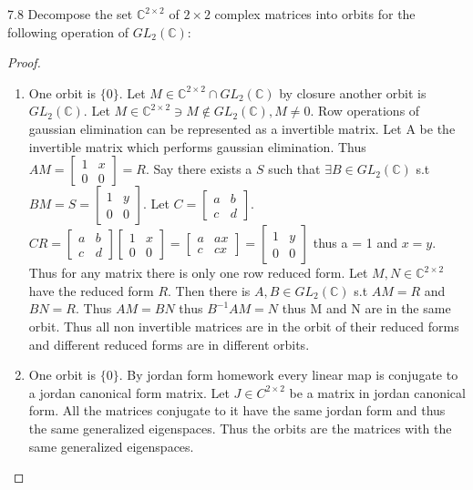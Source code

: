 \documentclass{article}
\newcommand{\C}{\mathbb{C}}
\begin{document}
\bigskip

\begin{PROB}{7.8}\label{Problem 7.8.}
    Decompose the set $\C^{2 \times 2}$ of $2 \times 2$ complex matrices into orbits for the following operation of $GL_2(\C)$:
\end{PROB}
\begin{proof}
    \begin{enumerate}{}
        \item One orbit is $\{0\}$. Let $M \in \C^{2 \times 2} \cap GL_2(\C)$ by closure another orbit is $GL_2(\C)$. Let $M \in \C^{2 \times 2} \ni M \not \in GL_2(\C), M \neq 0$. Row operations of gaussian elimination can be represented as a invertible matrix. Let A be the invertible matrix which performs gaussian elimination. Thus $AM = \begin{bmatrix}
            1 & x \\ 0 & 0
        \end{bmatrix} = R$. Say there exists a $S$ such that $\exists B \in GL_2(\C)$ s.t $BM = S = \begin{bmatrix}
            1 & y \\ 0 & 0
        \end{bmatrix}$. Let $C = \begin{bmatrix}
            a & b \\ c & d
        \end{bmatrix}$. $CR = \begin{bmatrix}
            a & b \\ c & d
        \end{bmatrix}\begin{bmatrix}
            1 & x \\ 0 & 0
        \end{bmatrix} = \begin{bmatrix}
            a & ax \\ c & cx
        \end{bmatrix} = \begin{bmatrix}
            1 & y \\ 0 & 0
        \end{bmatrix}$ thus a = 1 and $x = y$. Thus for any matrix there is only one row reduced form. Let $M, N \in \C^{2 \times 2}$ have the reduced form $R$. Then there is $A, B \in GL_2(\C)$ s.t $AM = R$ and $BN = R$. Thus $AM = BN$ thus $B^{-1}AM = N$ thus M and N are in the same orbit. Thus all non invertible matrices are in the orbit of their reduced forms and different reduced forms are in different orbits.
        \item One orbit is $\{0\}$. By jordan form homework every linear map is conjugate to a jordan canonical form matrix. Let $J \in C^{2 \times 2}$ be a matrix in jordan canonical form. All the matrices conjugate to it have the same jordan form and thus the same generalized eigenspaces. Thus the orbits are the matrices with the same generalized eigenspaces.
    \end{enumerate}
\end{proof}
\end{document}
